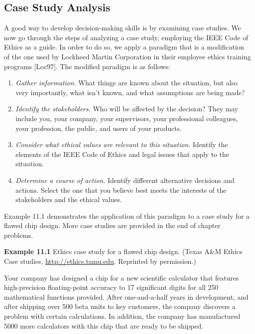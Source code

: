 \subsection{Case Study Analysis}\label{case-study-analysis}

A good way to develop decision-making skills is by examining case
studies. We now go through the steps of analyzing a case study,
employing the IEEE Code of Ethics as a guide. In order to do so, we
apply a paradigm that is a modification of the one used by Lockheed
Martin Corporation in their employee ethics training programs
{[}Loc97{]}. The modified paradigm is as follows:

\begin{enumerate}
\def\labelenumi{\arabic{enumi}.}
\item
  \emph{Gather information}. What things are known about the situation,
  but also very importantly, what isn't known, and what assumptions are
  being made?
\item
  \emph{Identify the stakeholders.} Who will be affected by the
  decision? They may include you, your company, your supervisors, your
  professional colleagues, your profession, the public, and users of
  your products.
\item
  \emph{Consider what ethical values are relevant to this situation.}
  Identify the elements of the IEEE Code of Ethics and legal issues that
  apply to the situation.
\item
  \emph{Determine a course of action.} Identify different alternative
  decisions and actions. Select the one that you believe best meets the
  interests of the stakeholders and the ethical values.
\end{enumerate}

Example 11.1 demonstrates the application of this paradigm to a case
study for a flawed chip design. More case studies are provided in the
end of chapter problems.

\textbf{Example 11.1} Ethics case study for a flawed chip design. (Texas
A\&M Ethics Case studies, \url{http://ethics.tamu.edu}. Reprinted by
permission.)

Your company has designed a chip for a new scientific calculator that
features high-precision floating-point accuracy to 17 significant digits
for all 250 mathematical functions provided. After one-and-a-half years
in development, and after shipping over 500 beta units to key customers,
the company discovers a problem with certain calculations. In addition,
the company has manufactured 5000 more calculators with this chip that
are ready to be shipped.

